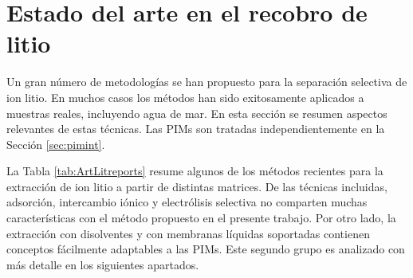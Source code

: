 \section{Estado del arte en el recobro de litio}\label{sec:estadodelarte}
Un gran número de metodologías se han propuesto para la separación selectiva de ion litio. En muchos casos los métodos han sido exitosamente aplicados a muestras reales, incluyendo agua de mar. En esta sección se resumen aspectos relevantes de estas técnicas. Las \acp{PIM} son tratadas independientemente en la Sección \ref{sec:pimint}.

La Tabla \ref{tab:ArtLitreports} resume algunos de los métodos recientes para la extracción de ion litio a partir de distintas matrices. De las técnicas incluidas, adsorción, intercambio iónico y electrólisis selectiva no comparten muchas características con el método propuesto en el presente trabajo. Por otro lado, la extracción con disolventes y con membranas líquidas soportadas contienen conceptos fácilmente adaptables a las \acp{PIM}. Este segundo grupo es analizado con más detalle en los siguientes apartados.

